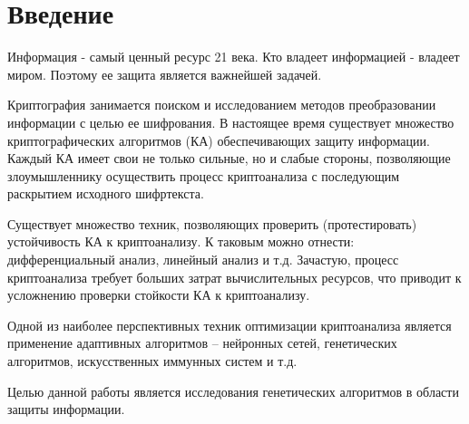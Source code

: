 \newpage
\chapter*{Введение}

Информация - самый ценный ресурс 21 века.
Кто владеет информацией - владеет миром.
Поэтому ее защита является важнейшей задачей.

Криптография занимается поиском и исследованием
методов преобразовании информации с целью ее шифрования.
 В настоящее время
существует множество криптографических алгоритмов (КА) обеспечивающих защиту
информации. Каждый КА имеет свои не только сильные, но и слабые стороны, позволяющие злоумышленнику осуществить процесс криптоанализа с последующим раскрытием исходного шифртекста.  

Существует множество техник, позволяющих проверить (протестировать)
устойчивость КА к криптоанализу. К таковым можно отнести: дифференциальный анализ, линейный анализ и т.д. Зачастую, процесс криптоанализа
требует больших затрат вычислительных ресурсов, что приводит к усложнению проверки стойкости КА к криптоанализу.

Одной из наиболее перспективных техник оптимизации криптоанализа
является применение адаптивных алгоритмов – нейронных сетей, генетических алгоритмов, искусственных иммунных систем и т.д.

Целью данной работы является исследования генетических алгоритмов в области защиты информации.


